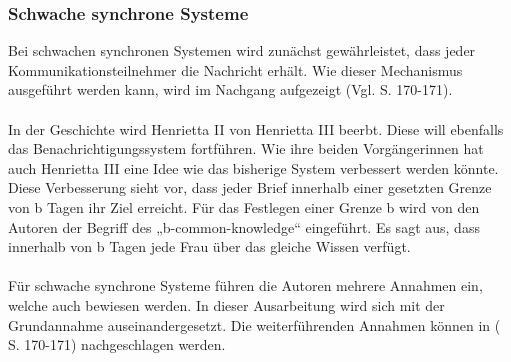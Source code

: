 \subsubsection{Schwache synchrone Systeme}
\label{schwach_sync_wissen}
Bei schwachen synchronen Systemen wird zunächst gewährleistet, dass jeder Kommunikationsteilnehmer die Nachricht erhält. Wie dieser Mechanismus ausgeführt werden kann, wird im Nachgang aufgezeigt (Vgl. \cite{moses1986cheating} S. 170-171).\\\\
In der Geschichte wird Henrietta II von Henrietta III beerbt. Diese will ebenfalls das Benachrichtigungssystem fortführen. Wie ihre beiden Vorgängerinnen hat auch Henrietta III eine Idee wie das bisherige System verbessert werden könnte. Diese Verbesserung sieht vor, dass jeder Brief innerhalb einer gesetzten Grenze von b Tagen ihr Ziel erreicht. Für das Festlegen einer Grenze b wird von den Autoren der Begriff des „b-common-knowledge“ eingeführt. Es sagt aus, dass innerhalb von b Tagen jede Frau über das gleiche Wissen verfügt.\\\\
Für schwache synchrone Systeme führen die Autoren mehrere Annahmen ein, welche auch bewiesen werden. In dieser Ausarbeitung wird sich mit der Grundannahme auseinandergesetzt. Die weiterführenden Annahmen können in (\cite{moses1986cheating} S. 170-171) nachgeschlagen werden.

